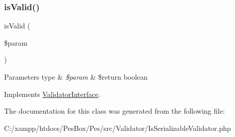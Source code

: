 \subsubsection{\texorpdfstring{is\+Valid()}{isValid()}}
{\footnotesize\ttfamily is\+Valid (\begin{DoxyParamCaption}\item[{}]{\$param }\end{DoxyParamCaption})}


\begin{DoxyParams}[1]{Parameters}
type & {\em \$param} & \$return boolean \\
\hline
\end{DoxyParams}


Implements \mbox{\hyperlink{interface_pes_1_1_validator_1_1_validator_interface_a250dbda694ce9c4d0dd4e71e1df35882}{Validator\+Interface}}.



The documentation for this class was generated from the following file\+:\begin{DoxyCompactItemize}
\item 
C\+:/xampp/htdocs/\+Pes\+Box/\+Pes/src/\+Validator/Is\+Serializable\+Validator.\+php\end{DoxyCompactItemize}
